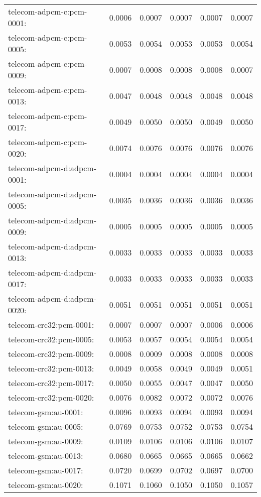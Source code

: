 \begin{longtable}{lrrrrr}
telecom-adpcm-c:pcm-0001: & 0.0006 & 0.0007 & 0.0007 & 0.0007 & 0.0007 \\
telecom-adpcm-c:pcm-0005: & 0.0053 & 0.0054 & 0.0053 & 0.0053 & 0.0054 \\
telecom-adpcm-c:pcm-0009: & 0.0007 & 0.0008 & 0.0008 & 0.0008 & 0.0007 \\
telecom-adpcm-c:pcm-0013: & 0.0047 & 0.0048 & 0.0048 & 0.0048 & 0.0048 \\
telecom-adpcm-c:pcm-0017: & 0.0049 & 0.0050 & 0.0050 & 0.0049 & 0.0050 \\
telecom-adpcm-c:pcm-0020: & 0.0074 & 0.0076 & 0.0076 & 0.0076 & 0.0076 \\
telecom-adpcm-d:adpcm-0001: & 0.0004 & 0.0004 & 0.0004 & 0.0004 & 0.0004 \\
telecom-adpcm-d:adpcm-0005: & 0.0035 & 0.0036 & 0.0036 & 0.0036 & 0.0036 \\
telecom-adpcm-d:adpcm-0009: & 0.0005 & 0.0005 & 0.0005 & 0.0005 & 0.0005 \\
telecom-adpcm-d:adpcm-0013: & 0.0033 & 0.0033 & 0.0033 & 0.0033 & 0.0033 \\
telecom-adpcm-d:adpcm-0017: & 0.0033 & 0.0033 & 0.0033 & 0.0033 & 0.0033 \\
telecom-adpcm-d:adpcm-0020: & 0.0051 & 0.0051 & 0.0051 & 0.0051 & 0.0051 \\
telecom-crc32:pcm-0001: & 0.0007 & 0.0007 & 0.0007 & 0.0006 & 0.0006 \\
telecom-crc32:pcm-0005: & 0.0053 & 0.0057 & 0.0054 & 0.0054 & 0.0054 \\
telecom-crc32:pcm-0009: & 0.0008 & 0.0009 & 0.0008 & 0.0008 & 0.0008 \\
telecom-crc32:pcm-0013: & 0.0049 & 0.0058 & 0.0049 & 0.0049 & 0.0051 \\
telecom-crc32:pcm-0017: & 0.0050 & 0.0055 & 0.0047 & 0.0047 & 0.0050 \\
telecom-crc32:pcm-0020: & 0.0076 & 0.0082 & 0.0072 & 0.0072 & 0.0076 \\
telecom-gsm:au-0001: & 0.0096 & 0.0093 & 0.0094 & 0.0093 & 0.0094 \\
telecom-gsm:au-0005: & 0.0769 & 0.0753 & 0.0752 & 0.0753 & 0.0754 \\
telecom-gsm:au-0009: & 0.0109 & 0.0106 & 0.0106 & 0.0106 & 0.0107 \\
telecom-gsm:au-0013: & 0.0680 & 0.0665 & 0.0665 & 0.0665 & 0.0662 \\
telecom-gsm:au-0017: & 0.0720 & 0.0699 & 0.0702 & 0.0697 & 0.0700 \\
telecom-gsm:au-0020: & 0.1071 & 0.1060 & 0.1050 & 0.1050 & 0.1057 \\
\end{longtable}
